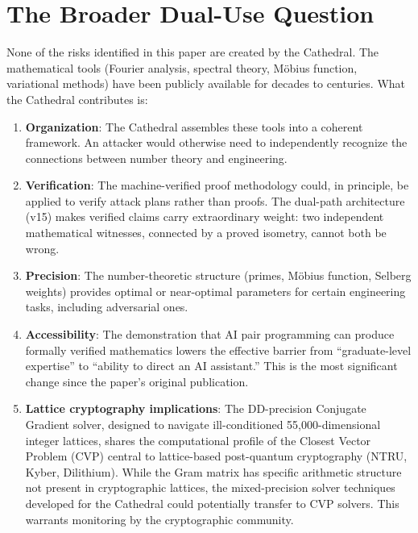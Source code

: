 \documentclass[11pt,a4paper]{article}
\begin{document}
\section{The Broader Dual-Use Question}

None of the risks identified in this paper are created by the
Cathedral. The mathematical tools (Fourier analysis, spectral
theory, M\"obius function, variational methods) have been publicly
available for decades to centuries. What the Cathedral contributes
is:

\begin{enumerate}
  \item \textbf{Organization}: The Cathedral assembles these tools
    into a coherent framework. An attacker would otherwise need to
    independently recognize the connections between number theory
    and engineering.
  \item \textbf{Verification}: The machine-verified proof
    methodology could, in principle, be applied to verify attack
    plans rather than proofs. The dual-path architecture (v15)
    makes verified claims carry extraordinary weight: two
    independent mathematical witnesses, connected by a proved
    isometry, cannot both be wrong.
  \item \textbf{Precision}: The number-theoretic structure (primes,
    M\"obius function, Selberg weights) provides optimal or
    near-optimal parameters for certain engineering tasks,
    including adversarial ones.
  \item \textbf{Accessibility}: The demonstration that AI pair
    programming can produce formally verified mathematics lowers
    the effective barrier from ``graduate-level expertise'' to
    ``ability to direct an AI assistant.'' This is the most
    significant change since the paper's original publication.
  \item \textbf{Lattice cryptography implications}: The DD-precision
    Conjugate Gradient solver, designed to navigate ill-conditioned
    55,000-dimensional integer lattices, shares the computational
    profile of the Closest Vector Problem (CVP) central to
    lattice-based post-quantum cryptography (NTRU, Kyber, Dilithium).
    While the Gram matrix has specific arithmetic structure not
    present in cryptographic lattices, the mixed-precision solver
    techniques developed for the Cathedral could potentially
    transfer to CVP solvers. This warrants monitoring by the
    cryptographic community.
\end{enumerate}
\end{document}
